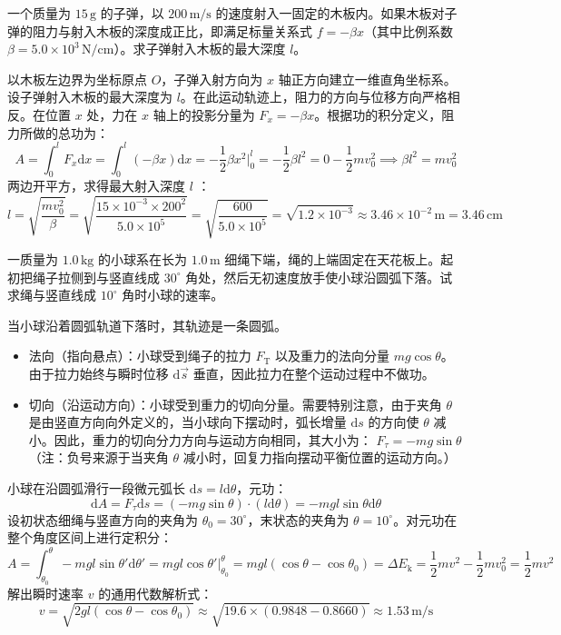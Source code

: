 \begin{exercise}
一个质量为 $15\,\text{g}$ 的子弹，以 $200\,\text{m/s}$ 的速度射入一固定的木板内。如果木板对子弹的阻力与射入木板的深度成正比，即满足标量关系式 $f = -\beta x$（其中比例系数 $\beta = 5.0 \times 10^3\,\text{N/cm}$）。求子弹射入木板的最大深度 $l$。
\end{exercise}
\begin{solution}
以木板左边界为坐标原点 $O$，子弹入射方向为 $x$ 轴正方向建立一维直角坐标系。设子弹射入木板的最大深度为 $l$。在此运动轨迹上，阻力的方向与位移方向严格相反。在位置 $x$ 处，力在 $x$ 轴上的投影分量为 $F_x = -\beta x$。根据功的积分定义，阻力所做的总功为：
$$A = \int_{0}^{l} F_x \mathrm{d}x = \int_{0}^{l} (-\beta x) \mathrm{d}x = -\frac{1}{2}\beta x^2 \Big|_0^l = -\frac{1}{2}\beta l^2= 0 - \frac{1}{2}mv_0^2 \implies \beta l^2 = mv_0^2$$
两边开平方，求得最大射入深度 $l$ ：$$l = \sqrt{\frac{mv_0^2}{\beta}}= \sqrt{\frac{15 \times 10^{-3} \times 200^2}{5.0 \times 10^5}}= \sqrt{\frac{600}{5.0 \times 10^5}} = \sqrt{1.2 \times 10^{-3}} \approx 3.46 \times 10^{-2}\,\text{m} = 3.46\,\text{cm}$$
\end{solution}

\begin{exercise}
一质量为 $1.0\,\text{kg}$ 的小球系在长为 $1.0\,\text{m}$ 细绳下端，绳的上端固定在天花板上。起初把绳子拉侧到与竖直线成 $30^\circ$ 角处，然后无初速度放手使小球沿圆弧下落。试求绳与竖直线成 $10^\circ$ 角时小球的速率。
\end{exercise}
\begin{solution}
 当小球沿着圆弧轨道下落时，其轨迹是一条圆弧。
 \begin{itemize}
 \item 法向（指向悬点）：小球受到绳子的拉力 $F_{\text{T}}$ 以及重力的法向分量 $mg\cos\theta$。由于拉力始终与瞬时位移 $\mathrm{d}\vec{s}$ 垂直，因此拉力在整个运动过程中不做功。
 \item 切向（沿运动方向）：小球受到重力的切向分量。需要特别注意，由于夹角 $\theta$ 是由竖直方向向外定义的，当小球向下摆动时，弧长增量 $\mathrm{d}s$ 的方向使 $\theta$ 减小。因此，重力的切向分力方向与运动方向相同，其大小为： \(F_\tau = -mg\sin\theta\) （注：负号来源于当夹角 $\theta$ 减小时，回复力指向摆动平衡位置的运动方向。）
 \end{itemize}
 小球在沿圆弧滑行一段微元弧长 $\mathrm{d}s = l\mathrm{d}\theta$，元功：
 $$\mathrm{d}A = F_\tau \mathrm{d}s = (-mg\sin\theta) \cdot (l\mathrm{d}\theta) = -mgl\sin\theta\mathrm{d}\theta$$
 设初状态细绳与竖直方向的夹角为 $\theta_0 = 30^\circ$，末状态的夹角为 $\theta = 10^\circ$。对元功在整个角度区间上进行定积分：$$A = \int_{\theta_0}^{\theta} -mgl\sin\theta' \mathrm{d}\theta' = mgl\cos\theta' \Big|_{\theta_0}^{\theta} = mgl(\cos\theta - \cos\theta_0)=\Delta E_{\text{k}} = \frac{1}{2}mv^2 - \frac{1}{2}mv_0^2=\frac{1}{2}mv^2$$解出瞬时速率 $v$ 的通用代数解析式：$$v = \sqrt{2gl(\cos\theta - \cos\theta_0)} \approx \sqrt{19.6 \times (0.9848 - 0.8660)}\approx 1.53\,\text{m/s}$$
\end{solution}

